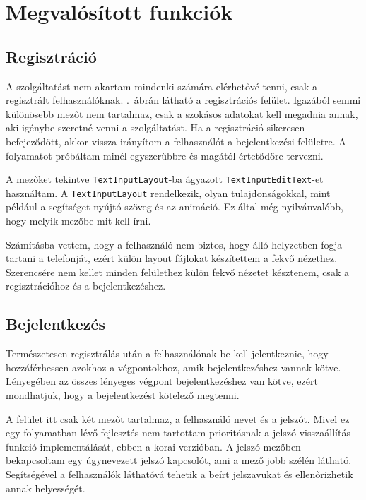 \documentclass{thesis-ekf}
\theoremstyle{definition}
\theoremstyle{remark}
\begin{document}
\chapter{Megvalósított funkciók}\label{funkciok}

\section{Regisztráció}

A szolgáltatást nem akartam mindenki számára elérhetővé tenni, csak a regisztrált felhasználóknak.
.~ábrán látható a regisztrációs felület.
Igazából semmi különösebb mezőt nem tartalmaz, csak a szokásos adatokat kell megadnia annak, aki igénybe szeretné venni a szolgáltatást.
Ha a regisztráció sikeresen befejeződött, akkor vissza irányítom a felhasználót a bejelentkezési felületre.
A folyamatot próbáltam minél egyszerűbbre és magától értetődőre tervezni.

A mezőket tekintve \texttt{TextInputLayout}-ba ágyazott \texttt{TextInputEditText}-et használtam.
A \texttt{TextInputLayout} rendelkezik, olyan tulajdonságokkal, mint például a segítséget nyújtó szöveg és az animáció.
Ez által még nyilvánvalóbb, hogy melyik mezőbe mit kell írni.

Számításba vettem, hogy a felhasználó nem biztos, hogy álló helyzetben fogja tartani a telefonját, ezért külön layout fájlokat készítettem a fekvő nézethez.
Szerencsére nem kellet minden felülethez külön fekvő nézetet késztenem, csak a regisztrációhoz és a bejelentkezéshez.

\section{Bejelentkezés}

Természetesen regisztrálás után a felhasználónak be kell jelentkeznie, hogy hozzáférhessen azokhoz a végpontokhoz, amik bejelentkezéshez vannak kötve.
Lényegében az összes lényeges végpont bejelentkezéshez van kötve, ezért mondhatjuk, hogy a bejelentkezést kötelező megtenni.

A felület itt csak két mezőt tartalmaz, a felhasználó nevet és a jelszót.
Mivel ez egy folyamatban lévő fejlesztés nem tartottam prioritásnak a jelszó visszaállítás funkció implementálását, ebben a korai verzióban.
A jelszó mezőben bekapcsoltam egy úgynevezett jelszó kapcsolót, ami a mező jobb szélén látható.
Segítségével a felhasználók láthatóvá tehetik a beírt jelszavukat és ellenőrizhetik annak helyességét.
\end{document}
